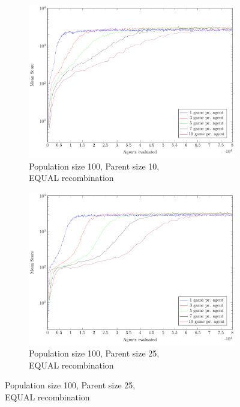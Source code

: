 \begin{figure}
    \centering
    \captionsetup[subfigure]{justification=centering}
    \begin{subfigure}[b]{0.49\textwidth}
    	\centering
        \caption{Population size 100, Parent size 10,\\EQUAL recombination}
        \includegraphics[width=\textwidth]{data/cma_population_offspring/100x_split/equal_l100_o10/mean/PlotFile.pdf}
    \end{subfigure} 
    \begin{subfigure}[b]{0.49\textwidth}
    	\centering
    	\caption{Population size 100, Parent size 25,\\EQUAL recombination}
        \includegraphics[width=\textwidth]{data/cma_population_offspring/100x_split/equal_l100_o25/mean/PlotFile.pdf}

\end{subfigure}
\end{figure}
